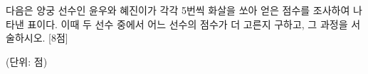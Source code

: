 다음은 양궁 선수인 윤우와 혜진이가 각각 5번씩 화살을 쏘아 얻은 점수를 조사하여 나타낸 표이다. 이때 두 선수 중에서 어느 선수의 점수가 더 고른지 구하고, 그 과정을 서술하시오. \mbox{[8점]}\par\noindent\hfill{\footnotesize (단위: 점)}\par{}
